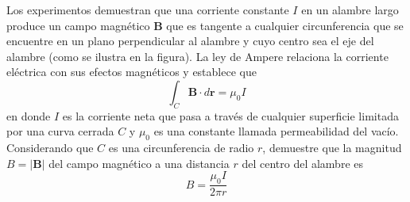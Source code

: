 \item Los experimentos demuestran que una corriente constante $I$ en un alambre largo produce un campo magnético $\mathbf{B}$ que es tangente a cualquier circunferencia que se encuentre en un plano perpendicular al alambre y cuyo centro sea el eje del alambre (como se ilustra en la figura). La ley de Ampere relaciona la corriente eléctrica con sus efectos magnéticos y establece que
    \[ \int_C \mathbf{B} \cdot d\mathbf{r} = \mu_0 I \]
    en donde $I$ es la corriente neta que pasa a través de cualquier superficie limitada por una curva cerrada $C$ y $\mu_0$ es una constante llamada permeabilidad del vacío. Considerando que $C$ es una circunferencia de radio $r$, demuestre que la magnitud $B = |\mathbf{B}|$ del campo magnético a una distancia $r$ del centro del alambre es
    \[ B = \frac{\mu_0 I}{2\pi r} \]

    \vspace{0.5cm}
    \begin{center}
    \end{center}
